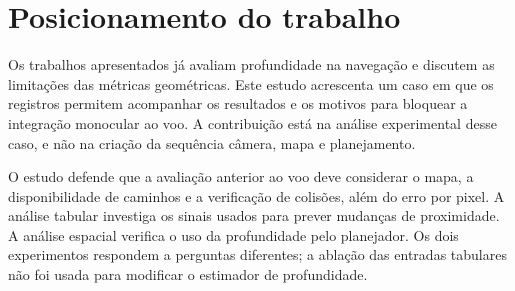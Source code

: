 \begin{table}[htb]
\centering
\caption{Comparação qualitativa com linhas de trabalhos relacionados.}
\label{tab:comparacao-relacionados}
\end{table}

\section{Posicionamento do trabalho}

Os trabalhos apresentados já avaliam profundidade na navegação e discutem as limitações das métricas geométricas. Este estudo acrescenta um caso em que os registros permitem acompanhar os resultados e os motivos para bloquear a integração monocular ao voo. A contribuição está na análise experimental desse caso, e não na criação da sequência câmera, mapa e planejamento.

O estudo defende que a avaliação anterior ao voo deve considerar o mapa, a disponibilidade de caminhos e a verificação de colisões, além do erro por pixel. A análise tabular investiga os sinais usados para prever mudanças de proximidade. A análise espacial verifica o uso da profundidade pelo planejador. Os dois experimentos respondem a perguntas diferentes; a ablação das entradas tabulares não foi usada para modificar o estimador de profundidade.

